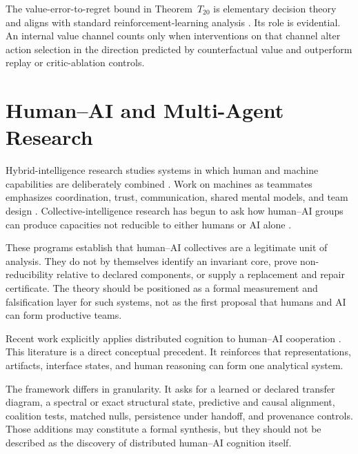 
The value-error-to-regret bound in Theorem~\(T_{20}\) is elementary decision
theory and aligns with standard reinforcement-learning analysis
\cite{SRWT:SuttonBarto2018}. Its role is evidential. An internal value channel
counts only when interventions on that channel alter action selection in the
direction predicted by counterfactual value and outperform replay or
critic-ablation controls.

\section{Human--AI and Multi-Agent Research}


Hybrid-intelligence research studies systems in which human and machine
capabilities are deliberately combined \cite{SRWT:DellermannEtAl2019}. Work on
machines as teammates emphasizes coordination, trust, communication, shared
mental models, and team design \cite{SRWT:SeeberEtAl2020}. Collective-intelligence
research has begun to ask how human--AI groups can produce capacities not
reducible to either humans or AI alone \cite{SRWT:GuptaEtAl2025}.

These programs establish that human--AI collectives are a legitimate unit of
analysis. They do not by themselves identify an invariant core, prove
non-reducibility relative to declared components, or supply a replacement and
repair certificate. The theory should be positioned as a formal
measurement and falsification layer for such systems, not as the first proposal
that humans and AI can form productive teams.


Recent work explicitly applies distributed cognition to human--AI cooperation
\cite{SRWT:SidjiEtAl2024,SRWT:ZhaoHan2026}. This literature is a direct conceptual
precedent. It reinforces that representations, artifacts, interface states,
and human reasoning can form one analytical system.

The framework differs in granularity. It asks for a learned or declared
transfer diagram, a spectral or exact structural state, predictive and causal
alignment, coalition tests, matched nulls, persistence under handoff, and
provenance controls. Those additions may constitute a formal synthesis, but
they should not be described as the discovery of distributed human--AI
cognition itself.

